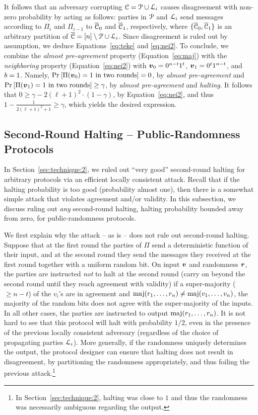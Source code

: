 It follows that an adversary corrupting $\mathcal{C}=\mathcal{P} \cup {\cal{L}}_i$ causes disagreement with non-zero probability by acting as follows: parties in $\mathcal{P}$ and ${\cal{L}}_i$ send messages according to $\Pi_i$ and $\Pi_{i-1}$ to $\overline{\mathcal{C}}_0$ and $\overline{\mathcal{C}}_1$, respectively, where $\{\overline{\mathcal{C}}_0,\overline{\mathcal{C}}_1\}$ is an arbitrary partition of $\overline{\mathcal{C}}= [n]\setminus \mathcal{P}\cup {\cal{L}}_i$. Since disagreement is ruled out by assumption, we deduce Equations~\ref{eq:teke} and \ref{eq:nei2}. To conclude, we combine the \emph{almost pre-agreement} property (Equation~\ref{eq:maj}) with the \emph{neighboring} property (Equation~\ref{eq:nei2}) with ${ \boldsymbol{v}}_0=0^{n-t}1^{t}$, ${ \boldsymbol{v}}_1=0^{t}1^{n-t}$, and $b=1$.
Namely, $\Pr_{}\left[\Pi({ \boldsymbol{v}}_0)=1\text{ in two rounds}\right]=0$, by \emph{almost pre-agreement} and $\Pr_{}\left[\Pi({ \boldsymbol{v}}_1)=1\text{ in two rounds}\right]\ge\gamma$, by \emph{almost pre-agreement} and \emph{halting}. It follows that $0 \ge \gamma - 2 (\ell +1)^2 \cdot (1-\gamma)$, by Equation~\ref{eq:nei2}, and thus $1-\frac{1}{2(\ell+1)^2+1} \ge \gamma$, which yields the desired expression.


\subsection{Second-Round Halting -- Public-Randomness Protocols}\label{sec:technique:3}

In Section~\ref{sec:technique:2}, we ruled out ``very good'' second-round halting for arbitrary protocols via an efficient locally consistent attack. Recall that if the halting probability is too good (probability almost one), then there is a somewhat simple attack that violates agreement and/or validity. In this subsection, we discuss ruling out \emph{any} second-round halting, \ie halting probability bounded away from zero, for public-randomness protocols.

We first explain why the attack -- as is -- does not rule out second-round halting. Suppose that at the first round the parties of $\Pi$ send a deterministic function of their input, and at the second round they send the messages they received at the first round together with a uniform random bit. On input ${ \boldsymbol{v}}$ and randomness ${ \boldsymbol{r}}$, the parties are instructed \emph{not} to halt at the second round (\ie carry on beyond the second round until they reach agreement with validity) if a super-majority ($\ge n-t$) of the $v_i$'s are in agreement and $\operatorname*{maj}(r_1,\ldots, r_n)\neq \operatorname*{maj}(v_1,\ldots, v_n)$, \ie the majority of the random bits does not agree with the super-majority of the inputs. In all other cases, the parties are instructed to output $\operatorname*{maj}(r_1,\ldots, r_n)$.
It is not hard to see that this protocol will halt with probability $1/2$, even in the presence of the previous locally consistent adversary (regardless of the choice of propagating parties ${\cal{L}}_i$). More generally, if the randomness uniquely determines the output, the protocol designer can ensure that halting does not result in disagreement, by partitioning the randomness appropriately, and thus foiling the previous attack.\footnote{In Section~\ref{sec:technique:2}, halting was close to $1$ and thus the randomness was necessarily ambiguous regarding the output.}

